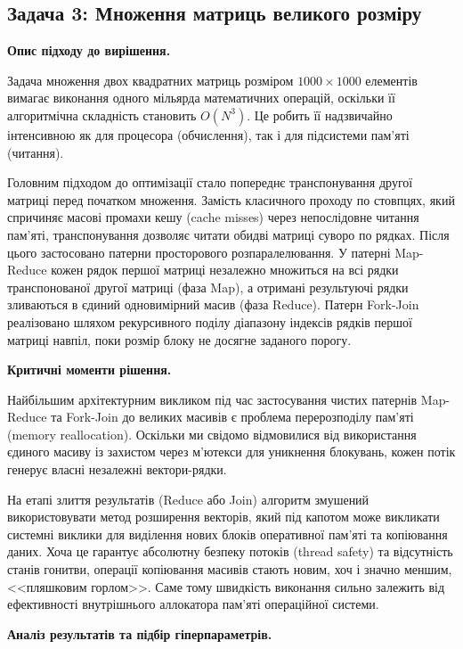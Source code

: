 \documentclass[14pt, a4paper]{extreport}
\begin{document}
	
	\subsection{Задача 3: Множення матриць великого розміру}
	
	\textbf{Опис підходу до вирішення.}
	
	Задача множення двох квадратних матриць розміром $1000 \times 1000$ елементів вимагає виконання одного мільярда математичних операцій, оскільки її алгоритмічна складність становить $O(N^3)$. Це робить її надзвичайно інтенсивною як для процесора (обчислення), так і для підсистеми пам'яті (читання). 
	
	Головним підходом до оптимізації стало попереднє транспонування другої матриці перед початком множення. Замість класичного проходу по стовпцях, який спричиняє масові промахи кешу (cache misses) через непослідовне читання пам'яті, транспонування дозволяє читати обидві матриці суворо по рядках. Після цього застосовано патерни просторового розпаралелювання. У патерні Map-Reduce кожен рядок першої матриці незалежно множиться на всі рядки транспонованої другої матриці (фаза Map), а отримані результуючі рядки зливаються в єдиний одновимірний масив (фаза Reduce). Патерн Fork-Join реалізовано шляхом рекурсивного поділу діапазону індексів рядків першої матриці навпіл, поки розмір блоку не досягне заданого порогу.
	
	\textbf{Критичні моменти рішення.}
	
	Найбільшим архітектурним викликом під час застосування чистих патернів Map-Reduce та Fork-Join до великих масивів є проблема перерозподілу пам'яті (memory reallocation). Оскільки ми свідомо відмовилися від використання єдиного масиву із захистом через м'ютекси для уникнення блокувань, кожен потік генерує власні незалежні вектори-рядки. 
	
	На етапі злиття результатів (Reduce або Join) алгоритм змушений використовувати метод розширення векторів, який під капотом може викликати системні виклики для виділення нових блоків оперативної пам'яті та копіювання даних. Хоча це гарантує абсолютну безпеку потоків (thread safety) та відсутність станів гонитви, операції копіювання масивів стають новим, хоч і значно меншим, <<пляшковим горлом>>. Саме тому швидкість виконання сильно залежить від ефективності внутрішнього аллокатора пам'яті операційної системи.
	
	\textbf{Аналіз результатів та підбір гіперпараметрів.}
	
\end{document}
